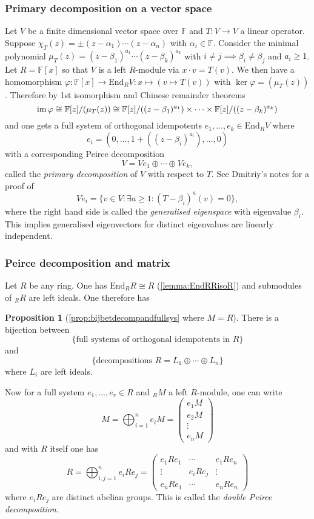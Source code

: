 \documentclass[a4paper]{article}
\newcommand{\F}{\mathbb{F}}
\newcommand{\End}{\text{End}}
\newcommand{\im}{\text{im\,}}
\theoremstyle{definition}
\newtheorem{prop}[defn]{Proposition}
\begin{document}
\subsubsection{Primary decomposition on a vector space}
\label{subsubsection:primdecomponvs}
Let $V$ be a finite dimensional vector space over $\F$ and $T:V\rightarrow V$ a linear operator. Suppose $\chi_T(z)=\pm (z-\alpha_1)\cdots (z-\alpha_n)$ with $\alpha_i\in\F$. Consider the minimal polynomial $\mu_T(z)=(z-\beta_1)^{a_1}\cdots(z-\beta_k)^{a_k}$ with $i\neq j\implies \beta_i\neq \beta_j$ and $a_i\geq 1$. Let $R=\F[x]$ so that $V$ is a left $R$-module via $x\cdot v=T(v)$. We then have a homomorphism $\varphi:\F[x]\rightarrow\End_R V:x\mapsto(v\mapsto T(v))$ with $\ker\varphi=(\mu_T(z))$. Therefore by 1st isomorphism and Chinese remainder theorems
\[
\im\varphi\cong \F[z]/(\mu_T(z))\cong \F[z]/((z-\beta_1)^{a_1})\times\cdots\times\F[z]/((z-\beta_k)^{a_k})
\]
and one gets a full system of orthogonal idempotents $e_1,\ldots,e_k\in\End_RV$ where
\[
e_i=(0,\ldots,1+((z-\beta_i)^{a_i}), \ldots,0)
\]
with a corresponding Peirce decomposition
\[
V=Ve_1\oplus\cdots\oplus Ve_k,
\]
called the \textit{primary decomposition} of $V$ with respect to $T$. See Dmitriy's notes for a proof of
\[
Ve_i=\{v\in V:\exists a\geq 1:(T-\beta_i)^a(v)=0\},
\]
where the right hand side is called the \textit{generalised eigenspace} with eigenvalue $\beta_i$. This implies generalised eigenvectors for distinct eigenvalues are linearly independent.

\subsubsection{Peirce decomposition and matrix}
Let $R$ be any ring. One has $\End_RR\cong R$ (\ref{lemma:EndRRisoR}) and submodules of $_RR$ are left ideals. One therefore has

\begin{prop}[\ref{prop:bijbetdecompandfullsys} where $M=R$]
There is a bijection between
\[
\{\text{full systems of orthogonal idempotents in }R\}
\]
and
\[
\{\text{decompositions }R=L_1\oplus\cdots\oplus L_n\}
\]
where $L_i$ are left ideals.
\end{prop}

Now for a full system $e_1,\ldots,e_r\in R$ and $_RM$ a left $R$-module, one can write
\[
M=\bigoplus_{i=1}^n e_iM=\begin{pmatrix}
e_1M\\e_2M\\ \vdots \\e_nM
\end{pmatrix}
\]
and with $R$ itself one has
\[
R=\bigoplus_{i,j=1}^n e_iRe_j=\begin{pmatrix}
e_1Re_1 & \cdots & e_1Re_n \\
\vdots & e_iRe_j & \vdots \\
e_nRe_1 & \cdots & e_nRe_n
\end{pmatrix}
\]
where $e_iRe_j$ are distinct abelian groups. This is called the \textit{double Peirce decomposition}.
\end{document}
